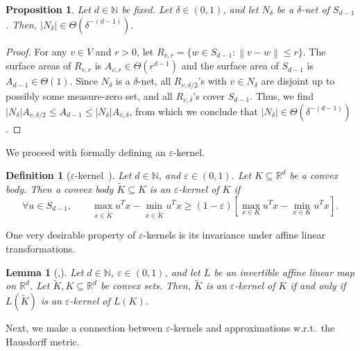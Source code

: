 \documentclass[11pt]{article}
\newtheorem{definition}[theorem]{Definition}
\newtheorem{lemma}[theorem]{Lemma}
\newtheorem{proposition}[theorem]{Proposition}
\newcommand{\N}{\ensuremath{\mathbb{N}}}
\newcommand{\R}{\ensuremath{\mathbb{R}}}
\newcommand{\norm}[1]{\ensuremath{\left\|#1\right\|}}
\begin{document}
    \begin{proposition}
        \label{lem:num-patches-lb}
        Let $d \in \N$ be fixed. Let $\delta \in (0,1)$, and let $N_{\delta}$ be a $\delta$-net of $S_{d-1}$. Then, $|N_{\delta}| \in \Theta(\delta^{-(d-1)})$.
    \end{proposition}

    \begin{proof}
        For any $v \in V$ and $r > 0$, let $R_{v,r} = \{w \in S_{d-1} : \norm{v-w} \leq r\}$. The surface areas of $R_{v,r}$ is $A_{v,r} \in \Theta(r^{d-1})$ and the surface area of $S_{d-1}$ is $A_{d-1} \in \Theta(1)$. Since $N_{\delta}$ is a $\delta$-net, all $R_{v,\delta/2}$'s with $v \in N_{\delta}$ are disjoint up to possibly some measure-zero set, and all $R_{v,\delta}$'s cover $S_{d-1}$. Thus, we find $|N_{\delta}|A_{v,\delta/2} \leq A_{d-1} \leq |N_{\delta}|A_{v,\delta}$, from which we conclude that $|N_{\delta}| \in \Theta(\delta^{-(d-1)})$.
    \end{proof}

    We proceed with formally defining an $\varepsilon$-kernel.

    \begin{definition}[$\varepsilon$-kernel~{\cite{agarwal2004approximating}}]
        \label{def:eps-kernel}
        Let $d \in \N$, and $\varepsilon \in (0,1)$. Let $K \subseteq \R^d$ be a convex body. Then a convex body $\widetilde{K} \subseteq K$ is an $\varepsilon$-kernel of $K$ if
        \[\forall u \in S_{d-1}, \qquad \max_{x \in \widetilde{K}} u^Tx - \min_{x \in \widetilde{K}} u^Tx \geq (1-\varepsilon)\left[\max_{x \in K} u^Tx - \min_{x \in K} u^Tx\right].\]
    \end{definition}

    One very desirable property of $\varepsilon$-kernels is its invariance under affine linear transformations.

    \begin{lemma}[{\cite{agarwal2004approximating},\cite[Lemma~2.5]{agarwal2024computing}}]
        \label{prop:eps-kernel-affine-transform}
        Let $d \in \N$, $\varepsilon \in (0,1)$, and let $L$ be an invertible affine linear map on $\R^d$. Let $\widetilde{K},K \subseteq \R^d$ be convex sets. Then, $\widetilde{K}$ is an $\varepsilon$-kernel of $K$ if and only if $L(\widetilde{K})$ is an $\varepsilon$-kernel of $L(K)$.
    \end{lemma}

    Next, we make a connection between $\varepsilon$-kernels and approximations w.r.t.\ the Hausdorff metric.
\end{document}
